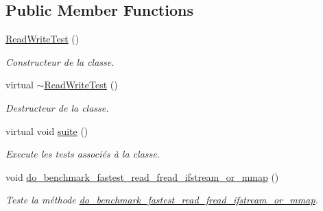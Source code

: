 \subsection*{Public Member Functions}
\begin{DoxyCompactItemize}
\item 
\mbox{\label{classtest_1_1ReadWriteTest_a34aee6bdf7cb2151faa7a86abdb81bda}} 
\hyperlink{classtest_1_1ReadWriteTest_a34aee6bdf7cb2151faa7a86abdb81bda}{Read\+Write\+Test} ()
\begin{DoxyCompactList}\small\item\em Constructeur de la classe. \end{DoxyCompactList}\item 
\mbox{\label{classtest_1_1ReadWriteTest_ad619c65beb0432640bfae05d08a240f0}} 
virtual \hyperlink{classtest_1_1ReadWriteTest_ad619c65beb0432640bfae05d08a240f0}{$\sim$\+Read\+Write\+Test} ()
\begin{DoxyCompactList}\small\item\em Destructeur de la classe. \end{DoxyCompactList}\item 
\mbox{\label{classtest_1_1ReadWriteTest_a1c81e27de2b7a0711e22e15d17482023}} 
virtual void \hyperlink{classtest_1_1ReadWriteTest_a1c81e27de2b7a0711e22e15d17482023}{suite} ()
\begin{DoxyCompactList}\small\item\em Execute les tests associés à la classe. \end{DoxyCompactList}\item 
\mbox{\label{classtest_1_1ReadWriteTest_a20d9bc1b8c886a3aba674646e0587f03}} 
void \hyperlink{classtest_1_1ReadWriteTest_a20d9bc1b8c886a3aba674646e0587f03}{do\+\_\+benchmark\+\_\+fastest\+\_\+read\+\_\+fread\+\_\+ifstream\+\_\+or\+\_\+mmap} ()
\begin{DoxyCompactList}\small\item\em Teste la méthode \hyperlink{classtest_1_1ReadWriteTest_a20d9bc1b8c886a3aba674646e0587f03}{do\+\_\+benchmark\+\_\+fastest\+\_\+read\+\_\+fread\+\_\+ifstream\+\_\+or\+\_\+mmap}. \end{DoxyCompactList}\item 
\mbox{\label{classtest_1_1ReadWriteTest_a81a816f63280407ab3b2f860d521444b}} 

\end{DoxyCompactItemize}
